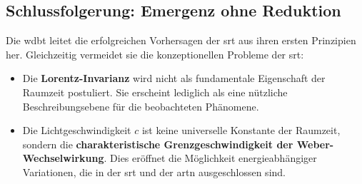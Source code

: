 \subsection{Schlussfolgerung: Emergenz ohne Reduktion}
Die \gls{wdbt} leitet die erfolgreichen Vorhersagen der \gls{srt} aus ihren ersten Prinzipien her. Gleichzeitig vermeidet sie die konzeptionellen Probleme der \gls{srt}:

\begin{itemize}
    \item Die \textbf{Lorentz-Invarianz} wird nicht als fundamentale Eigenschaft der Raumzeit postuliert. Sie erscheint lediglich als eine nützliche Beschreibungsebene für die beobachteten Phänomene.
    \item Die Lichtgeschwindigkeit $c$ ist keine universelle Konstante der Raumzeit, sondern die \textbf{charakteristische Grenzgeschwindigkeit der Weber-Wechselwirkung}. Dies eröffnet die Möglichkeit energieabhängiger Variationen, die in der \gls{srt} und der \gls{artn} ausgeschlossen sind.
\end{itemize}
